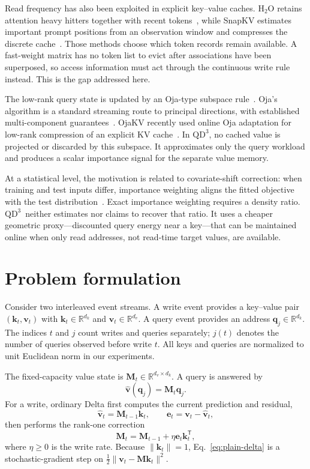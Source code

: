 \documentclass[pdflatex,sn-mathphys-num]{sn-jnl}
\theoremstyle{thmstyleone}
\newcommand{\R}{\mathbb{R}}
\newcommand{\M}{\bm{M}}
\newcommand{\kvec}{\bm{k}}
\newcommand{\qvec}{\bm{q}}
\newcommand{\vvec}{\bm{v}}
\newcommand{\evec}{\bm{e}}
\newcommand{\norm}[1]{\lVert#1\rVert}
\newcommand{\QDDD}{\ensuremath{\mathrm{QD}^{3}}}
\begin{document}
Read frequency has also been exploited in explicit key--value caches. H$_2$O retains attention heavy hitters together with recent tokens~\cite{zhang2023h2o}, while SnapKV estimates important prompt positions from an observation window and compresses the discrete cache~\cite{li2024snapkv}. Those methods choose which token records remain available. A fast-weight matrix has no token list to evict after associations have been superposed, so access information must act through the continuous write rule instead. This is the gap addressed here.

The low-rank query state is updated by an Oja-type subspace rule~\cite{oja1982}. Oja's algorithm is a standard streaming route to principal directions, with established multi-component guarantees~\cite{huang2021oja}. OjaKV recently used online Oja adaptation for low-rank compression of an explicit KV cache~\cite{zhu2025ojakv}. In \QDDD, no cached value is projected or discarded by this subspace. It approximates only the query workload and produces a scalar importance signal for the separate value memory.

At a statistical level, the motivation is related to covariate-shift correction: when training and test inputs differ, importance weighting aligns the fitted objective with the test distribution~\cite{sugiyama2007}. Exact importance weighting requires a density ratio. \QDDD\ neither estimates nor claims to recover that ratio. It uses a cheaper geometric proxy---discounted query energy near a key---that can be maintained online when only read addresses, not read-time target values, are available.

\section{Problem formulation}\label{sec:problem}

Consider two interleaved event streams. A write event provides a key--value pair $(\kvec_t,\vvec_t)$ with $\kvec_t\in\R^{d_k}$ and $\vvec_t\in\R^{d_v}$. A query event provides an address $\qvec_j\in\R^{d_k}$. The indices $t$ and $j$ count writes and queries separately; $j(t)$ denotes the number of queries observed before write $t$. All keys and queries are normalized to unit Euclidean norm in our experiments.

The fixed-capacity value state is $\M_t\in\R^{d_v\times d_k}$. A query is answered by
\begin{equation}
 \widehat{\vvec}(\qvec_j)=\M_t\qvec_j.
 \label{eq:read}
\end{equation}
For a write, ordinary Delta first computes the current prediction and residual,
\begin{equation}
 \widehat{\vvec}_t=\M_{t-1}\kvec_t,
 \qquad
 \evec_t=\vvec_t-\widehat{\vvec}_t,
 \label{eq:residual}
\end{equation}
then performs the rank-one correction
\begin{equation}
 \M_t=\M_{t-1}+\eta\evec_t\kvec_t^{\mathsf T},
 \label{eq:plain-delta}
\end{equation}
where $\eta\geq0$ is the write rate. Because $\norm{\kvec_t}=1$, Eq.~\eqref{eq:plain-delta} is a stochastic-gradient step on $\tfrac12\norm{\vvec_t-\M\kvec_t}^2$.
\end{document}
